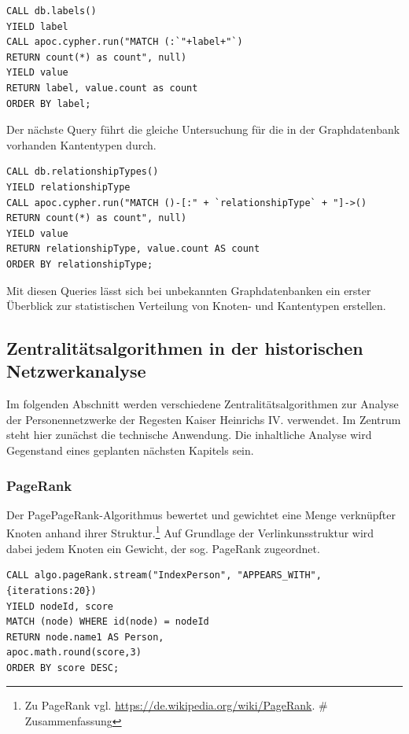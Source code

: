 \begin{verbatim}
CALL db.labels()
YIELD label
CALL apoc.cypher.run("MATCH (:`"+label+"`)
RETURN count(*) as count", null)
YIELD value
RETURN label, value.count as count
ORDER BY label;
\end{verbatim}

Der nächste Query führt die gleiche Untersuchung für die in der
Graphdatenbank vorhanden Kantentypen durch.

\begin{verbatim}
CALL db.relationshipTypes()
YIELD relationshipType
CALL apoc.cypher.run("MATCH ()-[:" + `relationshipType` + "]->()
RETURN count(*) as count", null)
YIELD value
RETURN relationshipType, value.count AS count
ORDER BY relationshipType;
\end{verbatim}

Mit diesen Queries lässt sich bei unbekannten Graphdatenbanken ein
erster Überblick zur statistischen Verteilung von Knoten- und
Kantentypen erstellen.

\hypertarget{zentralituxe4tsalgorithmen-in-der-historischen-netzwerkanalyse}{%
\subsection{Zentralitätsalgorithmen in der historischen
Netzwerkanalyse}\label{zentralituxe4tsalgorithmen-in-der-historischen-netzwerkanalyse}}

Im folgenden Abschnitt werden verschiedene Zentralitätsalgorithmen zur
Analyse der Personennetzwerke der Regesten Kaiser Heinrichs IV.
verwendet. Im Zentrum steht hier zunächst die technische Anwendung. Die
inhaltliche Analyse wird Gegenstand eines geplanten nächsten Kapitels
sein.

\hypertarget{pagerank}{%
\subsubsection{PageRank}\label{pagerank}}

Der PagePageRank-Algorithmus bewertet und gewichtet eine Menge
verknüpfter Knoten anhand ihrer Struktur.\footnote{Zu PageRank vgl.
  \url{https://de.wikipedia.org/wiki/PageRank}. \# Zusammenfassung} Auf
Grundlage der Verlinkunsstruktur wird dabei jedem Knoten ein Gewicht,
der sog. PageRank zugeordnet.

\begin{verbatim}
CALL algo.pageRank.stream("IndexPerson", "APPEARS_WITH",
{iterations:20})
YIELD nodeId, score
MATCH (node) WHERE id(node) = nodeId
RETURN node.name1 AS Person,
apoc.math.round(score,3)
ORDER BY score DESC;
\end{verbatim}

